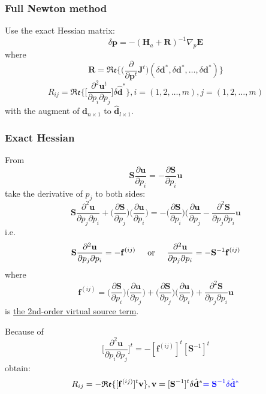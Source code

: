 \documentclass{article}
\newcommand{\prf}{This is relative path from \Papth to the paper file}
\newcommand{\pmk}{This is the brief info.}
\newcommand{\pti}{This is the paper tile}
\newcommand{\pay}{These are authors and year}
\newcommand{\pjo}{This is the journal}
\newcommand{\pda}{This is the date}
\newcommand{\mbf}[1]{\mathbf{#1}}
\newcommand{\myem}[1]{{\color{red}\uline{#1}}}
\newcommand{\myno}[1]{{\color{blue}#1}}
\newcommand{\myRe}{\mathfrak{Re}}
\begin{document}
\subsubsection{Full Newton method}
Use the exact Hessian matrix:
\[ \delta\mbf p=-(\mbf H_a+\mbf R)^{-1}\nabla_p\mbf E \]
where
\[ \mbf R=\myRe\Big\{\Big(\frac{\partial}{\partial\mbf p^t}\mbf J^t\Big)(\delta\mbf d^*,\delta\mbf d^*,\ldots,\delta\mbf d^*)\Big\} \]
\[ R_{ij}=\myRe\Big\{\Big[\frac{\partial^2\mbf u^t}{\partial p_i\partial p_j}\Big]\delta\hat{\mbf d}^*\Big\},i=(1,2,\ldots,m),j=(1,2,\ldots,m) \]
with the augment of $\mbf d_{n\times 1}$ to $\hat{\mbf d}_{l\times 1}$.\par
\subsubsection{Exact Hessian}
From
\[ \mbf S\frac{\partial\mbf u}{\partial p_i}=-\frac{\partial\mbf S}{\partial p_i}\mbf u \]
take the derivative of $p_j$ to both sides:
\[ \mbf S\frac{\partial^2\mbf u}{\partial p_j\partial p_i}+\Big(\frac{\partial\mbf S}{\partial p_j}\Big)\Big(\frac{\partial\mbf u}{\partial p_i}\Big)=-\Big(\frac{\partial\mbf S}{\partial p_i}\Big)\Big(\frac{\partial\mbf u}{\partial p_j}-\frac{\partial^2\mbf S}{\partial p_j\partial p_i}\mbf u \]
i.e.
\[ \mbf S\frac{\partial^2\mbf u}{\partial p_j\partial p_i}=-\mbf f^{(ij)} \text{\hspace{5mm}or\hspace{5mm}} \frac{\partial^2\mbf u}{\partial p_j\partial p_i}=-\mbf S^{-1}\mbf f^{(ij)} \]
where
\[ \mbf f^{(ij)}=\Big(\frac{\partial\mbf S}{\partial p_i}\Big)\Big(\frac{\partial\mbf u}{\partial p_j}\Big)+\Big(\frac{\partial\mbf S}{\partial p_j}\Big)\Big(\frac{\partial\mbf u}{\partial p_i}\Big)+\frac{\partial^2\mbf S}{\partial p_j\partial p_i}\mbf u \]
is \myem{the 2nd-order virtual source term}.\par
Because of
\[ \Big[\frac{\partial^2\mbf u}{\partial p_i\partial p_j}\Big]^t=-[\mbf f^{(ij)}]^t[\mbf S^{-1}]^t \]
obtain:
\[ R_{ij}=-\myRe\{[\mbf f^{(ij)}]^t\mbf v\},\mbf v=[\mbf S^{-1}]^t\delta\hat{\mbf d}^*\myno{=\mbf S^{-1}\delta\hat{\mbf d}^*} \]\par
\vspace{5mm}

\renewcommand{\pmk}{Pratt\_1999\_Geophy\_Frequency domain inversion}
\renewcommand{\prf}{FWI/\pmk.pdf}
\renewcommand{\pti}{Seismic waveform inversion in the frequency domain, Part 1: Theory and verification in a physical scale model}
\renewcommand{\pay}{R. Gerhard Pratt, 1999}
\renewcommand{\pjo}{Geophysics}
\renewcommand{\pda}{2016/9/14 Wen.}
\end{document}
